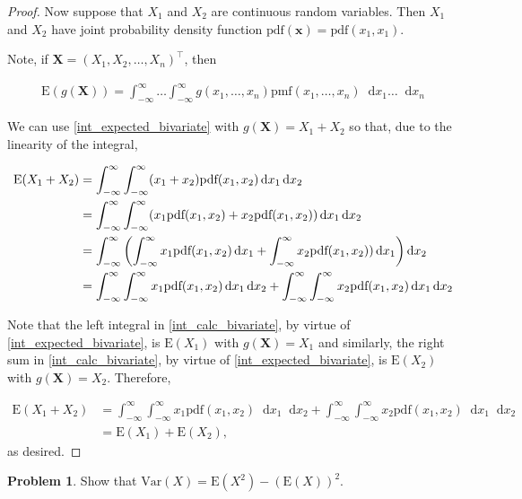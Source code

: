 \documentclass[12pt]{article}
\theoremstyle{definition}
\newtheorem{problem}{Problem}
\newcommand{\E}{\text{E}}
\newcommand{\V}{\text{Var}}
\newcommand{\pdf}{\text{pdf}}
\newcommand{\pmf}{\text{pmf}}
\newcommand*\diff{\mathop{}\!\mathrm{d}}
\newcommand{\vect}[1]{\boldsymbol{#1}}
\begin{document}
\begin{proof}
  Now suppose that $X_1$ and $X_2$ are continuous random variables. Then
  $X_1$ and $X_2$ have joint probability density function $\pdf(\vect{x}) = \pdf(x_1, x_1).$

  Note, if $\vect{X} =(X_1, X_2, \dots, X_n)^\intercal$, then

  \begin{align}\label{int_expected_bivariate}
    \E(g(\vect{X})) = \int_{-\infty}^{\infty} \dots \int_{-\infty}^{\infty} g(x_1, \dots, x_n) \pmf(x_1, \dots, x_n) \diff x_1 \dots \diff x_n
  \end{align}

  We can use \eqref{int_expected_bivariate} with $g(\vect{X}) = X_1 + X_2$ so that, due to the linearity of the integral,

  \begin{align}\label{int_calc_bivariate}
    \E(X_1 + X_2)
    &= \int_{-\infty}^{\infty} \int_{-\infty}^{\infty} (x_1 + x_2)\pdf(x_1, x_2) \diff x_1 \diff x_2 \notag \\
    &= \int_{-\infty}^{\infty} \int_{-\infty}^{\infty} (x_1\pdf(x_1, x_2) + x_2\pdf(x_1, x_2)) \diff x_1 \diff x_2 \notag \\
    &= \int_{-\infty}^{\infty} \left( \int_{-\infty}^{\infty} x_1\pdf(x_1, x_2) \diff x_1 + \int_{-\infty}^{\infty} x_2\pdf(x_1, x_2)) \diff x_1 \right) \diff x_2 \notag \\
    &= \int_{-\infty}^{\infty} \int_{-\infty}^{\infty} x_1\pdf(x_1, x_2) \diff x_1 \diff x_2 + \int_{-\infty}^{\infty} \int_{-\infty}^{\infty} x_2\pdf(x_1, x_2) \diff x_1 \diff x_2
  \end{align}

  Note that the left integral in \eqref{int_calc_bivariate}, by virtue of \eqref{int_expected_bivariate}, is
  $\E(X_1)$ with $g(\vect{X}) = X_1$ and similarly, the right sum in
  \eqref{int_calc_bivariate}, by virtue of \eqref{int_expected_bivariate}, is $\E(X_2)$ with
  $g(\vect{X}) = X_2$. Therefore,

  \begin{align*}
    \E(X_1 + X_2)
    &= \int_{-\infty}^{\infty} \int_{-\infty}^{\infty} x_1\pdf(x_1, x_2) \diff x_1 \diff x_2 + \int_{-\infty}^{\infty} \int_{-\infty}^{\infty} x_2\pdf(x_1, x_2) \diff x_1 \diff x_2 \\
    &= \E(X_1) + \E(X_2),
  \end{align*}
  as desired.

\end{proof}


\begin{problem}
  Show that $\V(X) = \E(X^2) - (\E(X))^2.$
\end{problem}
\end{document}
